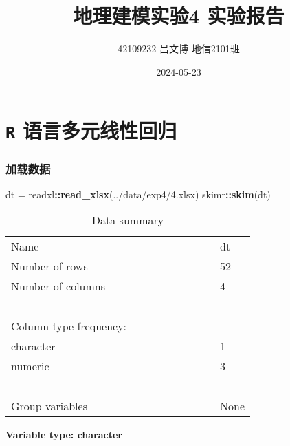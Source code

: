 \documentclass[
]{article}
\title{地理建模实验4 实验报告}
\author{42109232 \quad 吕文博 \quad 地信2101班}
\date{2024-05-23}
\newenvironment{Shaded}{\begin{snugshade}}{\end{snugshade}}
\newcommand{\FunctionTok}[1]{\textcolor[rgb]{0.13,0.29,0.53}{\textbf{#1}}}
\newcommand{\NormalTok}[1]{#1}
\newcommand{\OtherTok}[1]{\textcolor[rgb]{0.56,0.35,0.01}{#1}}
\newcommand{\SpecialCharTok}[1]{\textcolor[rgb]{0.81,0.36,0.00}{\textbf{#1}}}
\newcommand{\StringTok}[1]{\textcolor[rgb]{0.31,0.60,0.02}{#1}}
\begin{document}
\maketitle

\section{\texorpdfstring{\texttt{R}
语言多元线性回归}{R 语言多元线性回归}}\label{r-ux8bedux8a00ux591aux5143ux7ebfux6027ux56deux5f52}

\subsubsection{加载数据}\label{ux52a0ux8f7dux6570ux636e}

\begin{Shaded}
\begin{Highlighting}[]
\NormalTok{dt }\OtherTok{=}\NormalTok{ readxl}\SpecialCharTok{::}\FunctionTok{read\_xlsx}\NormalTok{(}\StringTok{\textquotesingle{}../data/exp4/4.xlsx\textquotesingle{}}\NormalTok{)}
\NormalTok{skimr}\SpecialCharTok{::}\FunctionTok{skim}\NormalTok{(dt)}
\end{Highlighting}
\end{Shaded}

\begin{longtable}[]{@{}ll@{}}
\caption{Data summary}\tabularnewline
\toprule\noalign{}
\endfirsthead
\endhead
\bottomrule\noalign{}
\endlastfoot
Name & dt \\
Number of rows & 52 \\
Number of columns & 4 \\
\_\_\_\_\_\_\_\_\_\_\_\_\_\_\_\_\_\_\_\_\_\_\_ & \\
Column type frequency: & \\
character & 1 \\
numeric & 3 \\
\_\_\_\_\_\_\_\_\_\_\_\_\_\_\_\_\_\_\_\_\_\_\_\_ & \\
Group variables & None \\
\end{longtable}

\textbf{Variable type: character}
\end{document}

